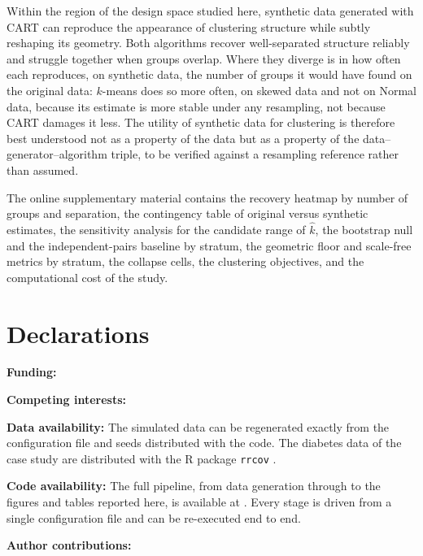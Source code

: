 \documentclass[pdflatex,referee]{sn-jnl}
\begin{document}
Within the region of the design space studied here, synthetic data generated
with CART can reproduce the appearance of clustering structure while subtly
reshaping its geometry. Both algorithms recover well-separated structure
reliably and struggle together when groups overlap. Where they diverge is in
how often each reproduces, on synthetic data, the number of groups it would
have found on the original data: $k$-means does so more often, on skewed data
and not on Normal data, because its estimate is more stable under any
resampling, not because CART damages it less. The utility of synthetic data for
clustering is therefore best understood not as a property of the data but as a
property of the data--generator--algorithm triple, to be verified against a
resampling reference rather than assumed.

\backmatter

The online supplementary material contains the recovery heatmap by number of
groups and separation, the contingency table of original versus synthetic
estimates, the sensitivity analysis for the candidate range of $\hat{k}$, the
bootstrap null and the independent-pairs baseline by stratum, the geometric
floor and scale-free metrics by stratum, the collapse cells, the clustering
objectives, and the computational cost of the study.

\section*{Declarations}

\noindent \textbf{Funding:} 

\noindent \textbf{Competing interests:} 

\noindent \textbf{Data availability:} The simulated data can be regenerated
  exactly from the configuration file and seeds distributed with the code. The
  diabetes data of the case study are distributed with the \textsf{R} package
  \texttt{rrcov} \citep{todorov2009}.

\noindent \textbf{Code availability:} The full pipeline, from data generation
  through to the figures and tables reported here, is available at
  \repourl{}. Every stage is driven
  from a single configuration file and can be re-executed end to end.

\noindent \textbf{Author contributions:} 


\end{document}
